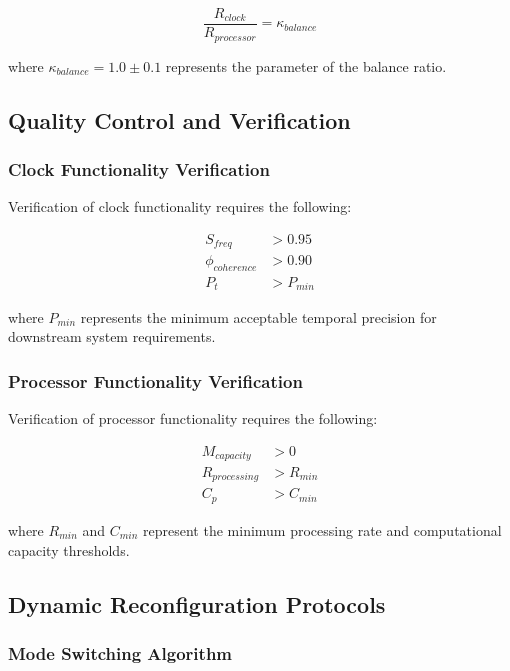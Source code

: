 \documentclass[12pt,a4paper]{article}
\begin{document}
\begin{equation}
\frac{R_{clock}}{R_{processor}} = \kappa_{balance}
\end{equation}

where $\kappa_{balance} = 1.0 \pm 0.1$ represents the parameter of the balance ratio.

\subsection{Quality Control and Verification}

\subsubsection{Clock Functionality Verification}

Verification of clock functionality requires the following:

\begin{align}
S_{freq} &> 0.95 \\
\phi_{coherence} &> 0.90 \\
P_t &> P_{min}
\end{align}

where $P_{min}$ represents the minimum acceptable temporal precision for downstream system requirements.

\subsubsection{Processor Functionality Verification}

Verification of processor functionality requires the following:

\begin{align}
M_{capacity} &> 0 \\
R_{processing} &> R_{min} \\
C_p &> C_{min}
\end{align}

where $R_{min}$ and $C_{min}$ represent the minimum processing rate and computational capacity thresholds.

\subsection{Dynamic Reconfiguration Protocols}

\subsubsection{Mode Switching Algorithm}
\end{document}
